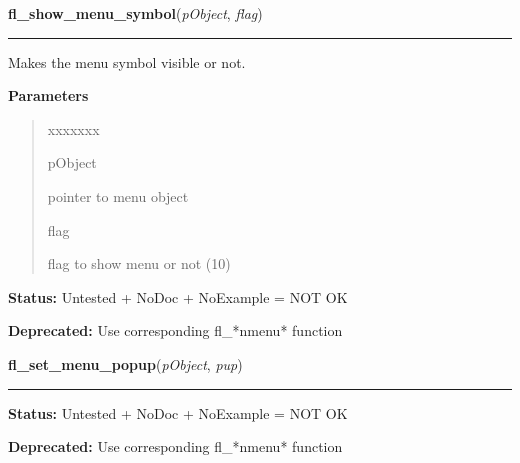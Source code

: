 \hspace{.8\funcindent}\begin{boxedminipage}{\funcwidth}

    \raggedright \textbf{fl\_show\_menu\_symbol}(\textit{pObject}, \textit{flag})

    \vspace{-1.5ex}

    \rule{\textwidth}{0.5\fboxrule}
\setlength{\parskip}{2ex}
    Makes the menu symbol visible or not.

\setlength{\parskip}{1ex}
      \textbf{Parameters}
      \vspace{-1ex}

      \begin{quote}
        \begin{Ventry}{xxxxxxx}

          \item[pObject]

          pointer to menu object

          \item[flag]

          flag to show menu or not (1{\textbar}0)

        \end{Ventry}

      \end{quote}

\textbf{Status:} Untested + NoDoc + NoExample = NOT OK



\textbf{Deprecated:} Use corresponding fl\_*nmenu* function



    \end{boxedminipage}

    \label{xformslib:deprecated:fl_set_menu_popup}

    \vspace{0.5ex}

\hspace{.8\funcindent}\begin{boxedminipage}{\funcwidth}

    \raggedright \textbf{fl\_set\_menu\_popup}(\textit{pObject}, \textit{pup})

    \vspace{-1.5ex}

    \rule{\textwidth}{0.5\fboxrule}
\setlength{\parskip}{2ex}
\setlength{\parskip}{1ex}
\textbf{Status:} Untested + NoDoc + NoExample = NOT OK



\textbf{Deprecated:} Use corresponding fl\_*nmenu* function



    \end{boxedminipage}

